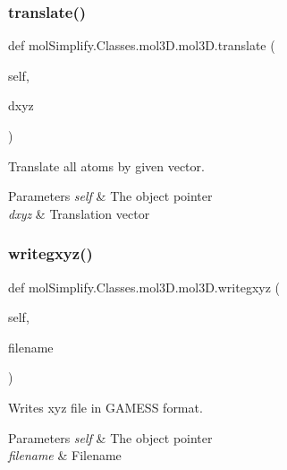 \subsubsection{\texorpdfstring{translate()}{translate()}}
{\footnotesize\ttfamily def mol\+Simplify.\+Classes.\+mol3\+D.\+mol3\+D.\+translate (\begin{DoxyParamCaption}\item[{}]{self,  }\item[{}]{dxyz }\end{DoxyParamCaption})}



Translate all atoms by given vector. 


\begin{DoxyParams}{Parameters}
{\em self} & The object pointer \\
\hline
{\em dxyz} & Translation vector \\
\hline
\end{DoxyParams}
\mbox{\label{classmolSimplify_1_1Classes_1_1mol3D_1_1mol3D_a773c0ca887457100e8034a8eacc28103}} 
\subsubsection{\texorpdfstring{writegxyz()}{writegxyz()}}
{\footnotesize\ttfamily def mol\+Simplify.\+Classes.\+mol3\+D.\+mol3\+D.\+writegxyz (\begin{DoxyParamCaption}\item[{}]{self,  }\item[{}]{filename }\end{DoxyParamCaption})}



Writes xyz file in G\+A\+M\+E\+SS format. 


\begin{DoxyParams}{Parameters}
{\em self} & The object pointer \\
\hline
{\em filename} & Filename \\
\hline
\end{DoxyParams}
\mbox{\label{classmolSimplify_1_1Classes_1_1mol3D_1_1mol3D_a21f8c2e9da6a3f0ec19120c00700f32b}} 
